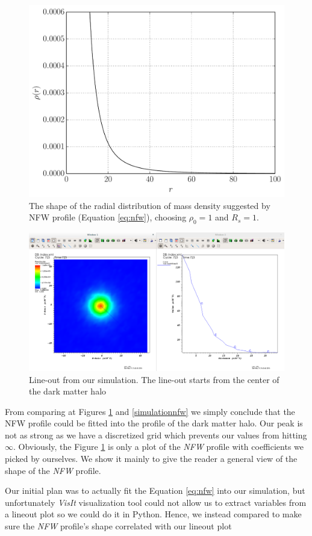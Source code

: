 \documentclass[notitlepage, 12pt]{article}
\begin{document}
\begin{figure}[H]
\centering
\includegraphics[width=.8\textwidth]{NFW_profile.pdf}
\caption{The shape of the radial distribution of mass density suggested by NFW profile (Equation \ref{eq:nfw}), choosing $\rho_0=1$ and $R_s=1$.}
\label{fig:nfw}
\end{figure}

\begin{figure}[H]
\centering
\includegraphics[width=.8\textwidth]{NFW-profile.png}
\caption{Line-out from our simulation. The line-out starts from the center of the dark matter halo}
\label{fig:simulationnfw}
\end{figure}

From comparing at Figures \ref{fig:nfw} and \ref{simulationnfw} we simply conclude that the NFW profile could be fitted into the profile of the dark matter 
halo. Our peak is not as strong as we have a discretized grid which prevents our values from hitting $\infty$. Obviously, the Figure \ref{fig:nfw} is only 
a plot of the \emph{NFW} profile with coefficients we picked by ourselves. We show it mainly to give the reader a general view of the shape of the 
\emph{NFW} profile.

Our initial 
plan was to actually fit the Equation \ref{eq:nfw} into our simulation, but unfortunately \emph{VisIt} visualization tool could not allow us to 
extract variables from a lineout plot so we could do it in Python. Hence, we instead compared to make sure the \emph{NFW} profile's shape correlated 
with our lineout plot
\end{document}
